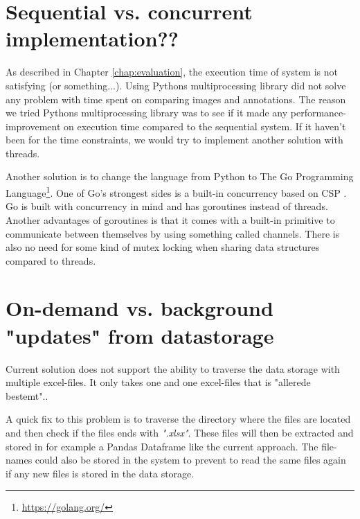\documentclass[USenglish]{uit-thesis}
\begin{document}
\section{Sequential vs. concurrent implementation??}
As described in Chapter \ref{chap:evaluation}, the execution time of system is not satisfying (or something...). Using Pythons multiprocessing library did not solve any problem with time spent on comparing images and annotations. The reason we tried Pythons multiprocessing library was to see if it made any performance-improvement on execution time compared to the sequential system. If it haven't been for the time constraints, we would try to implement another solution with threads.

Another solution is to change the language from Python to The Go Programming Language\footnote{\url{https://golang.org/}}. One of Go's strongest sides is a built-in concurrency based on CSP \cite{hoare}. Go is built with concurrency in mind and has goroutines instead of threads. Another advantages of goroutines is that it comes with a built-in primitive to communicate between themselves by using something called channels. There is also no need for some kind of mutex locking when sharing data structures compared to threads.




\section{On-demand vs. background "updates" from datastorage}
Current solution does not support the ability to traverse the data storage with multiple excel-files. It only takes one and one excel-files that is "allerede bestemt"..

A quick fix to this problem is to traverse the directory where the files are located and then check if the files ends with \textit{".xlsx"}. These files will then be extracted and stored in for example a Pandas Dataframe like the current approach. The file-names could also be stored in the system to prevent to read the same files again if any new files is stored in the data storage.
\end{document}
